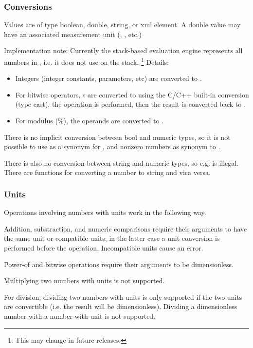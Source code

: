 \subsubsection{Conversions}

Values are of type boolean, double, string, or xml element. A double value
may have an associated measurement unit (, , etc.)

Implementation note: Currently the stack-based evaluation engine
represents all numbers in , i.e. it does not use 
on the stack.
    \footnote{This may change in future releases.}
Details:

\begin{itemize}
  \item Integers (integer constants,  parameters, etc) are
        converted to .
  \item For bitwise operators, s are converted to 
        using the C/C++ built-in conversion (type cast), the operation is performed,
        then the result is converted back to .
  \item For modulus (\%), the operands are converted to .
\end{itemize}

There is no implicit conversion between bool and numeric types, so it is
not possible to use  as a synonym for , and nonzero numbers
as synonym to .

There is also no conversion between string and numeric types, so e.g. 
is illegal. There are functions for converting a number to string and vica versa.

\subsubsection{Units}

Operations involving numbers with units work in the following way.

Addition, substraction, and numeric comparisons require their arguments to
have the same unit or compatible units; in the latter case a unit conversion
is performed before the operation. Incompatible units cause an error.

Power-of and bitwise operations require their arguments to be dimensionless.

Multiplying two numbers with units is not supported.

For division, dividing two numbers with units is only supported if the two
units are convertible (i.e. the result will be dimensionless). Dividing
a dimensionless number with a number with unit is not supported.


